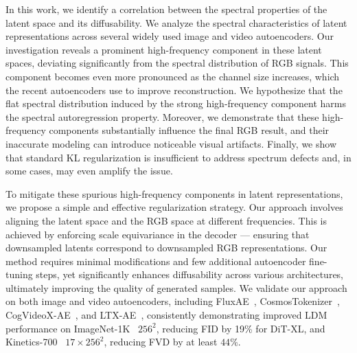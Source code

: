 In this work, we identify a correlation between the spectral properties of the latent space and its diffusability.
We analyze the spectral characteristics of latent representations across several widely used image and video autoencoders.
Our investigation reveals a prominent high-frequency component in these latent spaces, deviating significantly from the spectral distribution of RGB signals.
This component becomes even more pronounced as the channel size increases, which the recent autoencoders use to improve reconstruction.
We hypothesize that the flat spectral distribution induced by the strong high-frequency component harms the spectral autoregression property.
Moreover, we demonstrate that these high-frequency components substantially influence the final RGB result, and their inaccurate modeling can introduce noticeable visual artifacts.
Finally, we show that standard KL regularization is insufficient to address spectrum defects and, in some cases, may even amplify the issue.

To mitigate these spurious high-frequency components in latent representations, we propose a simple and effective regularization strategy.
Our approach involves aligning the latent space and the RGB space at different frequencies. 
This is achieved by enforcing scale equivariance in the decoder — ensuring that downsampled latents correspond to downsampled RGB representations.
Our method requires minimal modifications and few additional autoencoder fine-tuning steps, yet significantly enhances diffusability across various architectures, ultimately improving the quality of generated samples.
We validate our approach on both image and video autoencoders, including FluxAE~\cite{Flux}, CosmosTokenizer~\cite{CosmosTokenizer}, CogVideoX-AE~\cite{CogVideo}, and LTX-AE~\cite{LTX-video}, consistently demonstrating improved LDM performance on ImageNet-1K~\cite{ImageNet} $256^2$, reducing FID by 19\% for DiT-XL, and Kinetics-700~\cite{kinetics700} $17\times 256^2$, reducing FVD by at least $44\%$.

